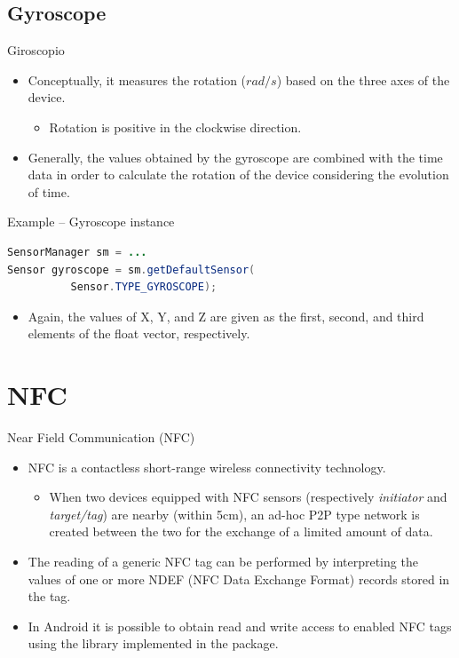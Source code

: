 \documentclass{beamer}
\begin{document}
\subsection{Gyroscope}

  \begin{frame}[fragile]{Giroscopio}
    \begin{itemize}\itemsep10pt
      \item Conceptually, it measures the rotation ($rad / s$) based on the three axes of the device.
      \begin{itemize}
        \item Rotation is positive in the clockwise direction.
      \end{itemize}
      \item Generally, the values obtained by the gyroscope are combined with
      the time data in order to calculate the rotation of the device considering
      the evolution of time.
    \end{itemize}

    \begin{exampleblock}{Example -- Gyroscope instance}
      \begin{lstlisting}[language=Java]  
SensorManager sm = ...
Sensor gyroscope = sm.getDefaultSensor(
          Sensor.TYPE_GYROSCOPE);
      \end{lstlisting}
    \end{exampleblock}
    \begin{itemize}
      \item Again, the values of X, Y, and Z are given as the first, second, and
      third elements of the float vector, respectively.
    \end{itemize}
  \end{frame}

\section{NFC}

  \begin{frame}{Near Field Communication (NFC)}
    \begin{itemize}\itemsep10pt
      \item NFC is a contactless short-range wireless connectivity technology.
      \begin{itemize}
        \item When two devices equipped with NFC sensors (respectively \textit{initiator}
        and \textit{target/tag}) are nearby (within 5cm), an ad-hoc P2P type network is
        created between the two for the exchange of a limited amount of data.
      \end{itemize}
      \item The reading of a generic NFC tag can be performed by interpreting
      the values of one or more NDEF (NFC Data Exchange Format) records stored
      in the tag.
      \item In Android it is possible to obtain read and write access to enabled
      NFC tags using the library implemented in the  package.
    \end{itemize}
  \end{frame}
\end{document}
